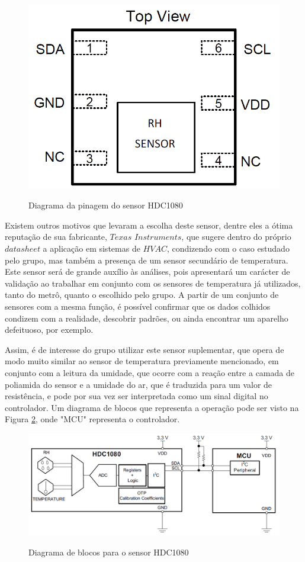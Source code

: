 \documentclass[acronym,symbols]{fei}
\begin{document}
\begin{figure}[!htb]
\centering
    \caption{Diagrama da pinagem do sensor HDC1080}
    \includegraphics[width=0.6\linewidth]{Imagens/PinHum.png}
    \label{fig:PinHum}
\end{figure}

Existem outros motivos que levaram a escolha deste sensor, dentre eles a ótima reputação de sua fabricante, $Texas$ $Instruments$, que sugere dentro do próprio $datasheet$ a aplicação em sistemas de $HVAC$, condizendo com o caso estudado pelo grupo, mas também a presença de um sensor secundário de temperatura. Este sensor será de grande auxílio às análises, pois apresentará um carácter de validação ao trabalhar em conjunto com os sensores de temperatura já utilizados, tanto do metrô, quanto o escolhido pelo grupo. A partir de um conjunto de sensores com a mesma função, é possível confirmar que os dados colhidos condizem com a realidade, descobrir padrões, ou ainda encontrar um aparelho defeituoso, por exemplo. 

Assim, é de interesse do grupo utilizar este sensor suplementar, que opera de modo muito similar ao sensor de temperatura previamente mencionado, em conjunto com a leitura da umidade, que ocorre com a reação entre a camada de poliamida do sensor e a umidade do ar, que é traduzida para um valor de resistência, e pode por sua vez ser interpretada como um sinal digital no controlador. Um diagrama de blocos que representa a operação pode ser visto na Figura \ref{fig:DiagBlocHum}, onde "MCU" representa o controlador.

\begin{figure}[!htb]
\centering
    \caption{Diagrama de blocos para o sensor HDC1080}
    \includegraphics[width=0.8\linewidth]{Imagens/DiagBlocHum.png}
    \label{fig:DiagBlocHum}
\end{figure}
\end{document}
